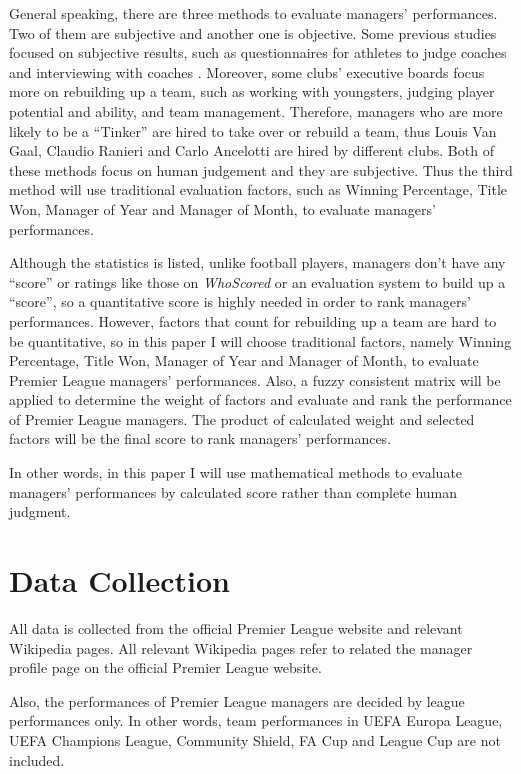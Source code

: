 \documentclass[12pt,a4paper]{article}
\begin{document}
    General speaking, there are three methods to evaluate managers' performances. Two of them are subjective and another one is objective. Some previous studies focused on subjective results, such as questionnaires for athletes to judge coaches \cite{rushall1985athletes} and interviewing with coaches \cite{cassidy2006evaluating}. Moreover, some clubs' executive boards focus more on rebuilding up a team, such as working with youngsters, judging player potential and ability, and team management. Therefore, managers who are more likely to be a ``Tinker'' are hired to take over or rebuild a team, thus Louis Van Gaal, Claudio Ranieri and Carlo Ancelotti are hired by different clubs. Both of these methods focus on human judgement and they are subjective. Thus the third method will use traditional evaluation factors, such as Winning Percentage, Title Won, Manager of Year and Manager of Month, to evaluate managers' performances. 
	
	
	Although the statistics is listed, unlike football players, managers don't have any ``score'' or ratings like those on \emph{WhoScored} or an evaluation system to build up a ``score'', so a quantitative score is highly needed in order to rank managers' performances. However, factors that count for rebuilding up a team are hard to be quantitative, so in this paper I will choose traditional factors, namely Winning Percentage, Title Won, Manager of Year and Manager of Month, to evaluate Premier League managers' performances. Also, a fuzzy consistent matrix will be applied to determine the weight of factors and evaluate and rank the performance of Premier League managers. The product of calculated weight and selected factors will be the final score to rank managers' performances.
	
	In other words, in this paper I will use mathematical methods to evaluate managers' performances by calculated score rather than complete human judgment. 
	
\section{Data Collection}

    All data is collected from the official Premier League website and relevant Wikipedia pages. All relevant Wikipedia pages refer to related the manager profile page on the official Premier League website.
    
    Also, the performances of Premier League managers are decided by league performances only. In other words, team performances in UEFA Europa League, UEFA Champions League, Community Shield, FA Cup and League Cup are not included.
    
\end{document}
